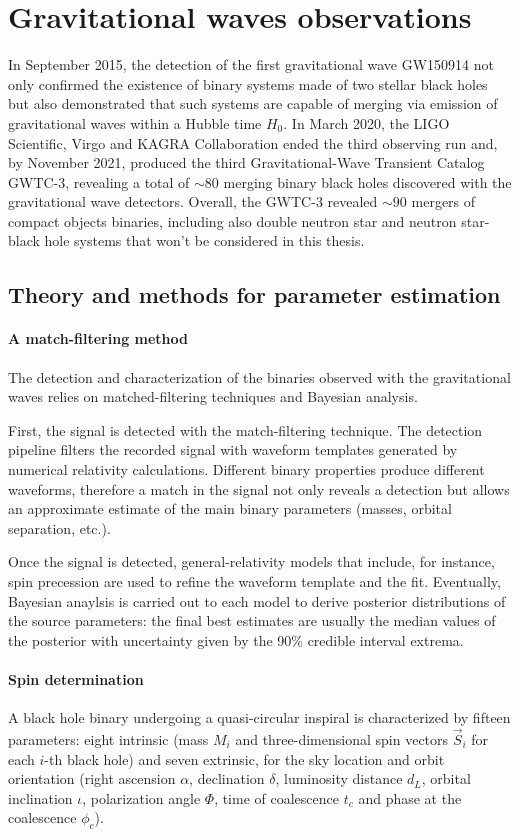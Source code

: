 \documentclass[a4paper,titlepage]{book}     	%
\begin{document}
\section{Gravitational waves observations}
In September 2015, the detection of the first gravitational wave GW150914 not only confirmed the existence of binary systems made of two stellar black holes but also demonstrated that such systems are capable of merging via emission of gravitational waves within a Hubble time $H_0$. \cite{Abbott2016firstGW} In March 2020, the LIGO Scientific, Virgo and KAGRA Collaboration ended the third observing run and, by November 2021, produced the third Gravitational-Wave Transient Catalog GWTC-3, revealing a total of $\sim 80$ merging binary black holes discovered with the gravitational wave detectors. Overall, the GWTC-3 revealed $\sim 90$ mergers of compact objects binaries, including also double neutron star and neutron star-black hole systems that won't be considered in this thesis. \cite{GWTC-3} \\

\subsection{Theory and methods for parameter estimation}
\paragraph{A match-filtering method} The detection and characterization of the binaries observed with the gravitational waves relies on matched-filtering techniques and Bayesian analysis. 

First, the signal is detected with the match-filtering technique. The detection pipeline filters the recorded signal with waveform templates generated by numerical relativity calculations. Different binary properties produce different waveforms, therefore a match in the signal not only reveals a detection but allows an approximate estimate of the main binary parameters (masses, orbital separation, etc.).

Once the signal is detected, general-relativity models that include, for instance, spin precession are used to refine the waveform template and the fit. Eventually, Bayesian anaylsis is carried out to each model to derive posterior distributions of the source parameters: the final best estimates are usually the median values of the posterior with uncertainty given by the 90\% credible interval extrema.

\paragraph{Spin determination} A black hole binary undergoing a quasi-circular inspiral is characterized by fifteen parameters: eight intrinsic (mass $M_i$ and three-dimensional spin vectors $\vec{S}_i$ for each $i$-th black hole) and seven extrinsic, for the sky location and orbit orientation (right ascension $\alpha$, declination $\delta$, luminosity distance $d_L$, orbital inclination $\iota$, polarization angle $\Phi$, time of coalescence $t_c$ and phase at the coalescence $\phi_c$). \cite{GWTC-1}
\end{document}
